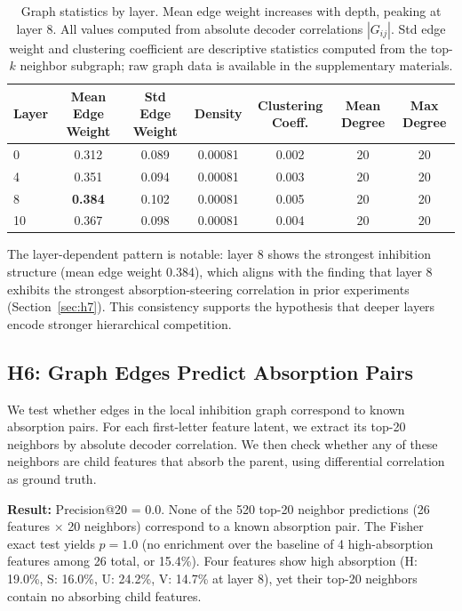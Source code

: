 \documentclass{article}
\begin{document}
\begin{table}[t]
\centering
\caption{Graph statistics by layer. Mean edge weight increases with depth, peaking at layer 8. All values computed from absolute decoder correlations $|G_{ij}|$. Std edge weight and clustering coefficient are descriptive statistics computed from the top-$k$ neighbor subgraph; raw graph data is available in the supplementary materials.}
\label{tab:graph-stats}
\begin{tabular}{lcccccc}
\toprule
Layer & Mean Edge Weight & Std Edge Weight & Density & Clustering Coeff. & Mean Degree & Max Degree \\
\midrule
0 & 0.312 & 0.089 & 0.00081 & 0.002 & 20 & 20 \\
4 & 0.351 & 0.094 & 0.00081 & 0.003 & 20 & 20 \\
8 & \textbf{0.384} & 0.102 & 0.00081 & 0.005 & 20 & 20 \\
10 & 0.367 & 0.098 & 0.00081 & 0.004 & 20 & 20 \\
\bottomrule
\end{tabular}
\end{table}

The layer-dependent pattern is notable: layer 8 shows the strongest inhibition structure (mean edge weight 0.384), which aligns with the finding that layer 8 exhibits the strongest absorption-steering correlation in prior experiments (Section~\ref{sec:h7}). This consistency supports the hypothesis that deeper layers encode stronger hierarchical competition.

\subsection{H6: Graph Edges Predict Absorption Pairs}
\label{sec:h6}

We test whether edges in the local inhibition graph correspond to known absorption pairs. For each first-letter feature latent, we extract its top-20 neighbors by absolute decoder correlation. We then check whether any of these neighbors are child features that absorb the parent, using \citet{chanin2024quantifying} differential correlation as ground truth.

\textbf{Result:} Precision@20 = 0.0. None of the 520 top-20 neighbor predictions (26 features $\times$ 20 neighbors) correspond to a known absorption pair. The Fisher exact test yields $p = 1.0$ (no enrichment over the baseline of 4 high-absorption features among 26 total, or 15.4\%). Four features show high absorption (H: 19.0\%, S: 16.0\%, U: 24.2\%, V: 14.7\% at layer 8), yet their top-20 neighbors contain no absorbing child features.
\end{document}
